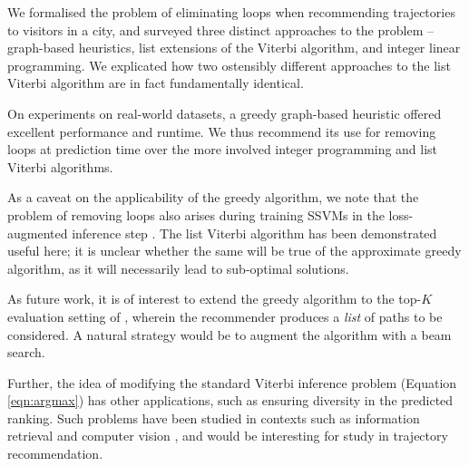 
We formalised the problem of eliminating loops when recommending trajectories to visitors in a city,
and surveyed three distinct approaches to the problem --
graph-based heuristics,
list extensions of the Viterbi algorithm,
and integer linear programming.
We explicated how two ostensibly different approaches to the list Viterbi algorithm \citep{seshadri1994list,nilsson2001sequentially} are in fact fundamentally identical.

On experiments on real-world datasets,
a greedy graph-based heuristic offered excellent performance and runtime.
We thus recommend its use
for removing loops at prediction time
over the more involved integer programming and list Viterbi algorithms.

As a caveat on the applicability of the greedy algorithm,
we note that the problem of removing loops also arises during training SSVMs in the loss-augmented inference step \citep{Chen:2017}.
The list Viterbi algorithm has been demonstrated useful here;
it is unclear whether the same will be true of the approximate greedy algorithm, as it will necessarily lead to sub-optimal solutions.

As future work, it is of interest to extend the greedy algorithm to the top-$K$ evaluation setting of \citet{Chen:2017}, wherein the recommender produces a \emph{list} of paths to be considered.
A natural strategy would be to augment the algorithm with a beam search.

Further, the idea of modifying the standard Viterbi inference problem (Equation \ref{eqn:argmax}) has other applications, such
as ensuring diversity in the predicted ranking.
Such problems have been studied in contexts such as information retrieval \citep{Carbonell:1998} and computer vision \citep{Park:2011},
and would be interesting for study in trajectory recommendation.

